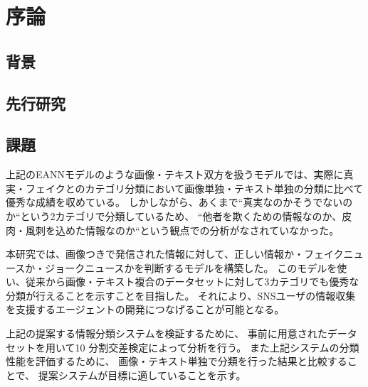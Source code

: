 \chapter{序論}
%
\section{背景}


\section{先行研究}


\section{課題}
上記のEANNモデルのような画像・テキスト双方を扱うモデルでは、実際に真実・フェイクとのカテゴリ分類において画像単独・テキスト単独の分類に比べて優秀な成績を収めている\cite{eann}。
しかしながら、あくまで``真実なのかそうでないのか``という2カテゴリで分類しているため、
``他者を欺くための情報なのか、皮肉・風刺を込めた情報なのか``という観点での分析がなされていなかった。

本研究では、画像つきで発信された情報に対して、正しい情報か・フェイクニュースか・ジョークニュースかを判断するモデルを構築した。
このモデルを使い、従来から画像・テキスト複合のデータセットに対して3カテゴリでも優秀な分類が行えることを示すことを目指した。
それにより、SNSユーザの情報収集を支援するエージェントの開発につなげることが可能となる。

上記の提案する情報分類システムを検証するために、
事前に用意されたデータセットを用いて10 分割交差検定によって分析を行う。
また上記システムの分類性能を評価するために、
画像・テキスト単独で分類を行った結果と比較することで、
提案システムが目標に適していることを示す。

% 
